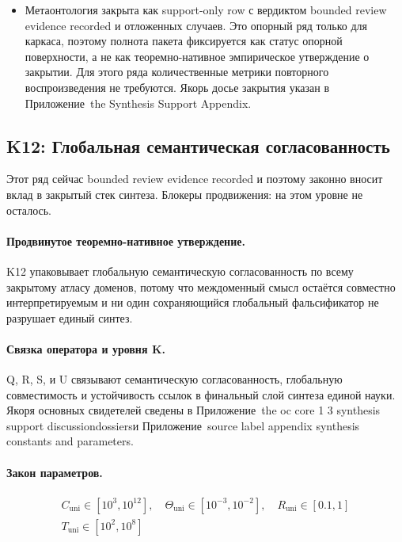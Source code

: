\begin{itemize}[leftmargin=1.6em,nosep]
\item Метаонтология закрыта как support-only row с вердиктом bounded review evidence recorded и  отложенных случаев. Это опорный ряд только для каркаса, поэтому полнота пакета фиксируется как статус опорной поверхности, а не как теоремно-нативное эмпирическое утверждение о закрытии. Для этого ряда количественные метрики повторного воспроизведения не требуются. Якорь досье закрытия указан в Приложение~the Synthesis Support Appendix.
\end{itemize}

\subsection{K12: Глобальная семантическая согласованность}
\label{sec:oc-core-1-3-synthesis-k12}
Этот ряд сейчас bounded review evidence recorded и поэтому законно вносит вклад в закрытый стек синтеза.
Блокеры продвижения: на этом уровне не осталось.

\paragraph{Продвинутое теоремно-нативное утверждение.}
K12 упаковывает глобальную семантическую согласованность по всему закрытому атласу доменов, потому что междоменный смысл остаётся совместно интерпретируемым и ни один сохраняющийся глобальный фальсификатор не разрушает единый синтез.

\paragraph{Связка оператора и уровня K.}
Q, R, S, и U связывают семантическую согласованность, глобальную совместимость и устойчивость ссылок в финальный слой синтеза единой науки.
Якоря основных свидетелей сведены в Приложение~the oc core 1 3 synthesis support discussiondossiersи Приложение~source label appendix synthesis constants and parameters.

\paragraph{Закон параметров.}
\[
\begin{gathered} C_{\mathrm{uni}} \in [10^3,10^{12}],\quad \Theta_{\mathrm{uni}} \in [10^{-3},10^{-2}],\quad R_{\mathrm{uni}} \in [0.1,1] \\ T_{\mathrm{uni}} \in [10^2,10^8] \end{gathered}
\]

